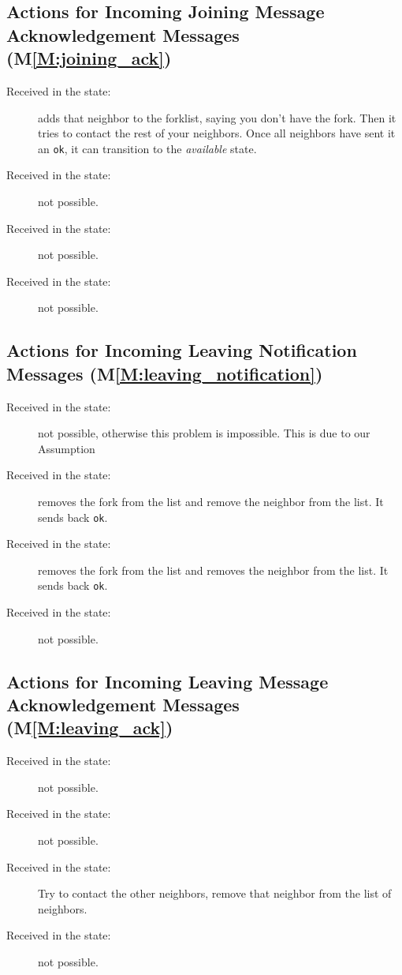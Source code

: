 \documentclass[11pt]{article}
\begin{document}
\subsection{Actions for Incoming Joining Message Acknowledgement Messages (M\ref{M:joining_ack})}
\begin{description}
\item[Received in the \joining state:] adds that neighbor to the forklist, saying you don't have the fork. Then it tries to contact the rest of your neighbors. Once all neighbors have sent it an \texttt{ok}, it can transition to the \emph{available} state.
\item[Received in the \available state:] not possible.
\item[Received in the \leaving state:] not possible.
\item[Received in the \gone state:] not possible.
\end{description}

\subsection{Actions for Incoming Leaving Notification Messages (M\ref{M:leaving_notification})}
\begin{description}
\item[Received in the \joining state:] not possible, otherwise this problem is impossible. This is due to our Assumption
\item[Received in the \available state:] removes the fork from the list and remove the neighbor from the list. It sends back \texttt{ok}.
\item[Received in the \leaving state:] removes the fork from the list and removes the neighbor from the list. It sends back \texttt{ok}.
\item[Received in the \gone state:] not possible.
\end{description}

\subsection{Actions for Incoming Leaving Message Acknowledgement Messages (M\ref{M:leaving_ack})}
\begin{description}
\item[Received in the \joining state:] not possible.
\item[Received in the \available state:] not possible.
\item[Received in the \leaving state:] Try to contact the other neighbors, remove that neighbor from the list of neighbors.
\item[Received in the \gone state:] not possible.
\end{description}
\end{document}
